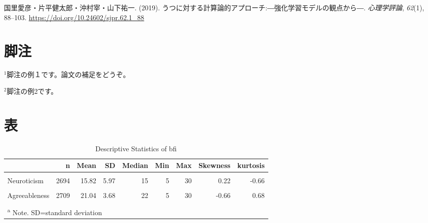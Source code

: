 \documentclass[11pt,a4paper,xelatex,ja=standard]{bxjsarticle}
\begin{document}
\leavevmode\hypertarget{ref-kunisato2019}{}%
国里愛彦・片平健太郎・沖村宰・山下祐一. (2019).
うつに対する計算論的アプローチ:―強化学習モデルの観点から―.
\emph{心理学評論}, \emph{62}(1), 88--103.
\url{https://doi.org/10.24602/sjpr.62.1_88}

\clearpage

\hypertarget{ux811aux6ce8}{%
\section{脚注}\label{ux811aux6ce8}}

\({}^1\)脚注の例１です。論文の補足をどうぞ。

\({}^2\)脚注の例2です。

\clearpage 
{}

\hypertarget{ux8868}{%
\section{表}\label{ux8868}}

\begin{table}[!h]

\caption{\label{tab:unnamed-chunk-4}Descriptive Statistics of bfi}
\centering
\begin{tabular}[t]{lrrrrrrrr}
\toprule
  & n & Mean & SD & Median & Min & Max & Skewness & kurtosis\\
\midrule
\cellcolor{gray!6}{Extraversion} & \cellcolor{gray!6}{2713} & \cellcolor{gray!6}{18.96} & \cellcolor{gray!6}{2.71} & \cellcolor{gray!6}{19} & \cellcolor{gray!6}{5} & \cellcolor{gray!6}{29} & \cellcolor{gray!6}{0.01} & \cellcolor{gray!6}{1.08}\\
Neuroticism & 2694 & 15.82 & 5.97 & 15 & 5 & 30 & 0.22 & -0.66\\
\cellcolor{gray!6}{Conscientiousness} & \cellcolor{gray!6}{2707} & \cellcolor{gray!6}{19.04} & \cellcolor{gray!6}{2.77} & \cellcolor{gray!6}{19} & \cellcolor{gray!6}{5} & \cellcolor{gray!6}{30} & \cellcolor{gray!6}{-0.17} & \cellcolor{gray!6}{0.81}\\
Agreeableness & 2709 & 21.04 & 3.68 & 22 & 5 & 30 & -0.66 & 0.68\\
\cellcolor{gray!6}{Openness} & \cellcolor{gray!6}{2726} & \cellcolor{gray!6}{19.34} & \cellcolor{gray!6}{2.74} & \cellcolor{gray!6}{19} & \cellcolor{gray!6}{5} & \cellcolor{gray!6}{29} & \cellcolor{gray!6}{-0.02} & \cellcolor{gray!6}{1.09}\\
\bottomrule
\multicolumn{9}{l}{\textsuperscript{a} Note. SD=standard deviation}\\
\end{tabular}
\end{table}
\end{document}
